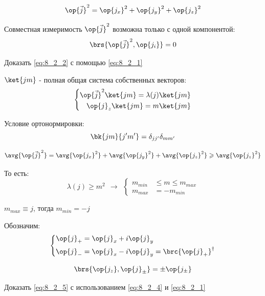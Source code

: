 $$
\op{\vec{j}}^2 = \op{j_x}^2 + \op{j_y}^2 + \op{j_z}^2
$$

Совместная измеримость $\op{\vec{j}}^2$ возможна только с одной компонентой:
\begin{equation}
\label{eq:8_2_2}
\brs{\op{\vec{j}}^2, \op{j_i}} = 0
\end{equation}

\begin{excr}
Доказать \eqref{eq:8_2_2} с помощью \eqref{eq:8_2_1}
\end{excr}

$\ket{jm}$ - полная общая система собственных векторов:
\begin{equation}
\label{eq:8_2_3}
\left\{
\begin{aligned}
\op{\vec{j}}^2 \ket{jm} = \lambda(j) \ket{jm} \\
\op{j}_z \ket{jm} = m \ket{jm}
\end{aligned}
\right.
\end{equation}

Условие ортонормировки:
$$
\bk{jm}{j'm'} = \delta_{jj'} \delta_{mm'}
$$

$$
\avg{\op{\vec{j}}^2} = \avg{\op{j_x}^2} + \avg{\op{j_y}^2} + \avg{\op{j_z}^2} \geqslant \avg{\op{j_z}^2}
$$

То есть:
$$
\lambda(j) \geqslant m^2 ~~\rightarrow~~ \left\{
\begin{aligned}
m_{min} &\leqslant m \leqslant m_{max}\\
m_{max} &= - m_{min}
\end{aligned}
\right.
$$

$m_{max} \equiv j$, тогда $m_{min} = -j$

Обозначим:
\begin{equation}
\label{eq:8_2_4}
\left\{
\begin{aligned}
\op{j}_{+} &= \op{j}_{x} + i \op{j}_{y} \\
\op{j}_{-} &= \op{j}_{x} - i \op{j}_{y} = \brc{\op{j}_{+}}^\dag
\end{aligned}
\right.
\end{equation}

\begin{equation}
\label{eq:8_2_5}
\brs{\op{j_z}, \op{j}_{\pm}} = \pm \op{j_{\pm}}
\end{equation}

\begin{excr}
Доказать \eqref{eq:8_2_5} с использованием \eqref{eq:8_2_4} и \eqref{eq:8_2_1}
\end{excr}

